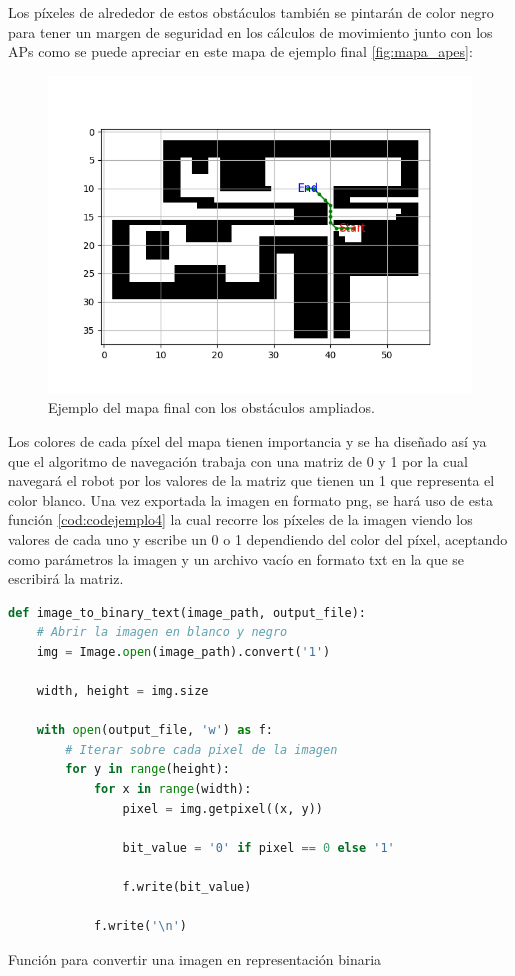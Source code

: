 Los píxeles de alrededor de estos obstáculos también se pintarán de color negro para tener un margen de seguridad en los cálculos de movimiento junto con los APs como se puede apreciar en este mapa de ejemplo final \ref{fig:mapa_apes}:


\begin{figure}[H]
  \centering
  \includegraphics[scale=0.8]{figs/astar} %
  \caption{ Ejemplo del mapa final con los obstáculos ampliados.}
  \label{fig:astar}
\end{figure}

Los colores de cada píxel del mapa tienen importancia y se ha diseñado así ya que el algoritmo de navegación trabaja con una matriz de 0 y 1 por la cual navegará el robot por los valores de la matriz que tienen un 1 que representa el color blanco. Una vez exportada la imagen en formato png, se hará uso de esta función \ref{cod:codejemplo4} la cual recorre los píxeles de la imagen viendo los valores de cada uno y escribe un 0 o 1 dependiendo del color del píxel, aceptando como parámetros la imagen y un archivo vacío en formato txt en la que se escribirá la matriz.

\begin{code}[H]
\begin{lstlisting}[language=Python]
def image_to_binary_text(image_path, output_file):
    # Abrir la imagen en blanco y negro
    img = Image.open(image_path).convert('1') 

    width, height = img.size
   
    with open(output_file, 'w') as f:
        # Iterar sobre cada pixel de la imagen
        for y in range(height):
            for x in range(width):
                pixel = img.getpixel((x, y))

                bit_value = '0' if pixel == 0 else '1'

                f.write(bit_value)

            f.write('\n') 
\end{lstlisting}
\caption[Función para convertir una imagen en representación binaria ]{Función para convertir una imagen en representación binaria}
\label{cod:codejemplo4}
\end{code}

